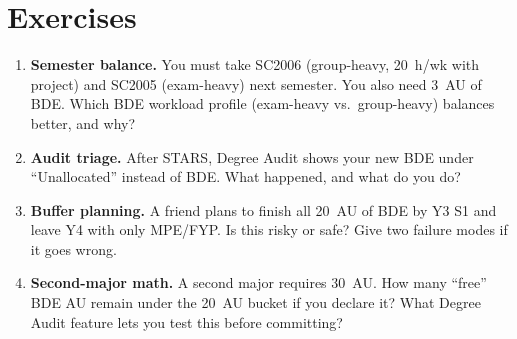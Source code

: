 \section{Exercises}
\label{sec:ch03-exercises}
\begin{enumerate}[label=E3.\arabic*, leftmargin=*, itemsep=0.8em]
    \item \textbf{Semester balance.} You must take SC2006 (group-heavy, 20~h/wk with project) and SC2005 (exam-heavy) next semester. You also need 3~AU of BDE. Which BDE workload profile (exam-heavy vs.\ group-heavy) balances better, and why?
    \item \textbf{Audit triage.} After STARS, Degree Audit shows your new BDE under ``Unallocated'' instead of BDE. What happened, and what do you do?
    \item \textbf{Buffer planning.} A friend plans to finish all 20~AU of BDE by Y3 S1 and leave Y4 with only MPE/FYP. Is this risky or safe? Give two failure modes if it goes wrong.
    \item \textbf{Second-major math.} A second major requires 30~AU. How many ``free'' BDE AU remain under the 20~AU bucket if you declare it? What Degree Audit feature lets you test this before committing?
\end{enumerate}
